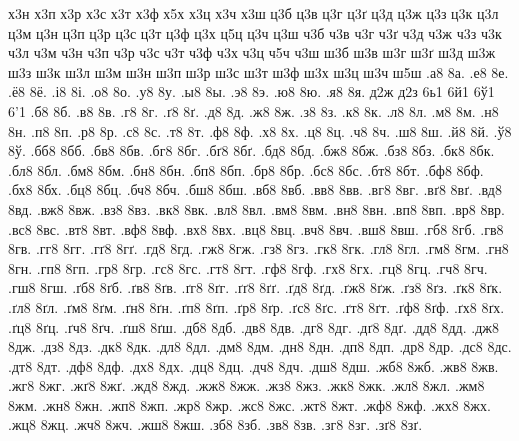 {х3н
х3п
х3р
х3с
х3т
х3ф
х5х
х3ц
х3ч
х3ш
ц3б
ц3в
ц3г
ц3ґ
ц3д
ц3ж
ц3з
ц3к
ц3л
ц3м
ц3н
ц3п
ц3р
ц3с
ц3т
ц3ф
ц3х
ц5ц
ц3ч
ц3ш
ч3б
ч3в
ч3г
ч3ґ
ч3д
ч3ж
ч3з
ч3к
ч3л
ч3м
ч3н
ч3п
ч3р
ч3с
ч3т
ч3ф
ч3х
ч3ц
ч5ч
ч3ш
ш3б
ш3в
ш3г
ш3ґ
ш3д
ш3ж
ш3з
ш3к
ш3л
ш3м
ш3н
ш3п
ш3р
ш3с
ш3т
ш3ф
ш3х
ш3ц
ш3ч
ш5ш
.а8
8а.
.е8
8е.
.ё8
8ё.
.і8
8і.
.о8
8о.
.у8
8у.
.ы8
8ы.
.э8
8э.
.ю8
8ю.
.я8
8я.
д2ж
д2з
6ь1
6й1
6ў1
6'1
.б8
8б.
.в8
8в.
.г8
8г.
.ґ8
8ґ.
.д8
8д.
.ж8
8ж.
.з8
8з.
.к8
8к.
.л8
8л.
.м8
8м.
.н8
8н.
.п8
8п.
.р8
8р.
.с8
8с.
.т8
8т.
.ф8
8ф.
.х8
8х.
.ц8
8ц.
.ч8
8ч.
.ш8
8ш.
.й8
8й.
.ў8
8ў.
.бб8
8бб.
.бв8
8бв.
.бг8
8бг.
.бґ8
8бґ.
.бд8
8бд.
.бж8
8бж.
.бз8
8бз.
.бк8
8бк.
.бл8
8бл.
.бм8
8бм.
.бн8
8бн.
.бп8
8бп.
.бр8
8бр.
.бс8
8бс.
.бт8
8бт.
.бф8
8бф.
.бх8
8бх.
.бц8
8бц.
.бч8
8бч.
.бш8
8бш.
.вб8
8вб.
.вв8
8вв.
.вг8
8вг.
.вґ8
8вґ.
.вд8
8вд.
.вж8
8вж.
.вз8
8вз.
.вк8
8вк.
.вл8
8вл.
.вм8
8вм.
.вн8
8вн.
.вп8
8вп.
.вр8
8вр.
.вс8
8вс.
.вт8
8вт.
.вф8
8вф.
.вх8
8вх.
.вц8
8вц.
.вч8
8вч.
.вш8
8вш.
.гб8
8гб.
.гв8
8гв.
.гг8
8гг.
.гґ8
8гґ.
.гд8
8гд.
.гж8
8гж.
.гз8
8гз.
.гк8
8гк.
.гл8
8гл.
.гм8
8гм.
.гн8
8гн.
.гп8
8гп.
.гр8
8гр.
.гс8
8гс.
.гт8
8гт.
.гф8
8гф.
.гх8
8гх.
.гц8
8гц.
.гч8
8гч.
.гш8
8гш.
.ґб8
8ґб.
.ґв8
8ґв.
.ґг8
8ґг.
.ґґ8
8ґґ.
.ґд8
8ґд.
.ґж8
8ґж.
.ґз8
8ґз.
.ґк8
8ґк.
.ґл8
8ґл.
.ґм8
8ґм.
.ґн8
8ґн.
.ґп8
8ґп.
.ґр8
8ґр.
.ґс8
8ґс.
.ґт8
8ґт.
.ґф8
8ґф.
.ґх8
8ґх.
.ґц8
8ґц.
.ґч8
8ґч.
.ґш8
8ґш.
.дб8
8дб.
.дв8
8дв.
.дг8
8дг.
.дґ8
8дґ.
.дд8
8дд.
.дж8
8дж.
.дз8
8дз.
.дк8
8дк.
.дл8
8дл.
.дм8
8дм.
.дн8
8дн.
.дп8
8дп.
.др8
8др.
.дс8
8дс.
.дт8
8дт.
.дф8
8дф.
.дх8
8дх.
.дц8
8дц.
.дч8
8дч.
.дш8
8дш.
.жб8
8жб.
.жв8
8жв.
.жг8
8жг.
.жґ8
8жґ.
.жд8
8жд.
.жж8
8жж.
.жз8
8жз.
.жк8
8жк.
.жл8
8жл.
.жм8
8жм.
.жн8
8жн.
.жп8
8жп.
.жр8
8жр.
.жс8
8жс.
.жт8
8жт.
.жф8
8жф.
.жх8
8жх.
.жц8
8жц.
.жч8
8жч.
.жш8
8жш.
.зб8
8зб.
.зв8
8зв.
.зг8
8зг.
.зґ8
8зґ.
}
